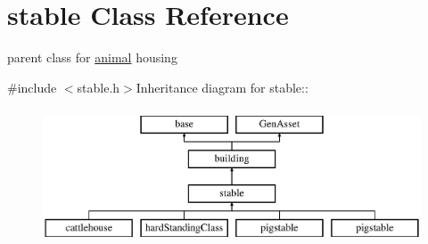 \hypertarget{classstable}{
\section{stable Class Reference}
\label{classstable}
}


parent class for \hyperlink{classanimal}{animal} housing  


{\ttfamily \#include $<$stable.h$>$}Inheritance diagram for stable::\begin{figure}[H]
\begin{center}
\leavevmode
\includegraphics[height=4cm]{classstable}
\end{center}
\end{figure}
